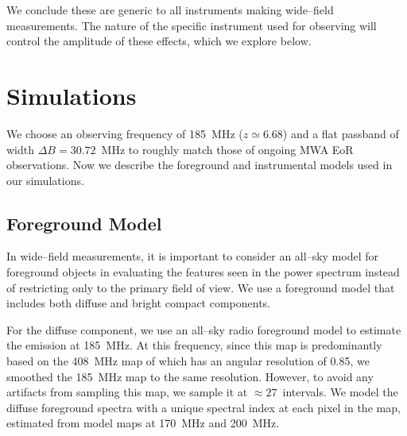 \documentclass[preprint2,iop,numberedappendix,twocolappendix,appendixfloats]{emulateapj}
\begin{document}
We conclude these are generic to all instruments making wide--field measurements. The nature of the specific instrument used for observing will control the amplitude of these effects, which we explore below. 

\section{Simulations}\label{sec:sim}

We choose an observing frequency of 185~MHz ($z\simeq 6.68$) and a flat passband of width $\Delta B = 30.72$~MHz to roughly match those of ongoing MWA EoR observations. Now we describe the foreground and instrumental models used in our simulations. 

\subsection{Foreground Model}\label{sec:foreground}

In wide--field measurements, it is important to consider an all--sky model for foreground objects in evaluating the features seen in the power spectrum instead of restricting only to the primary field of view. We use a foreground model that includes both diffuse and bright compact components.  


For the diffuse component, we use an all--sky radio foreground model \citep{deo08} to estimate the emission at 185~MHz. At this frequency, since this map is predominantly based on the 408~MHz map of \citet{has82} which has an angular resolution of 0.85\arcdeg, we smoothed the 185~MHz map to the same resolution. However, to avoid any artifacts from sampling this map, we sample it at $\approx 27$\arcmin~intervals. We model the diffuse foreground spectra with a unique spectral index at each pixel in the map, estimated from model maps at 170~MHz and 200~MHz.

\end{document}
